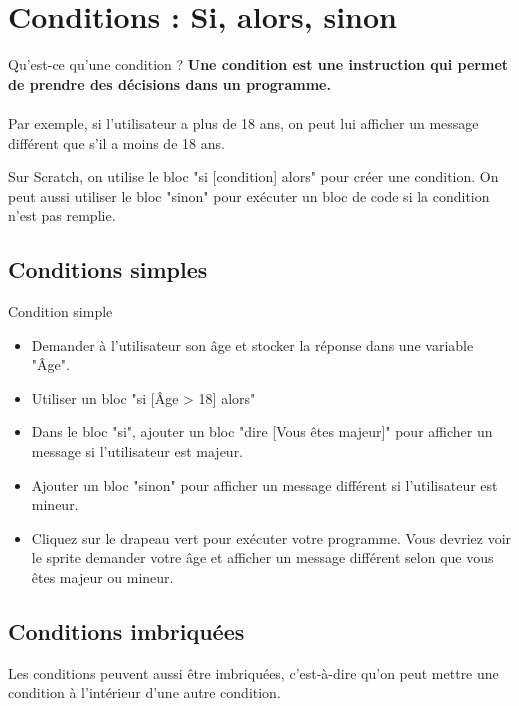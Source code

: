 


\section{Conditions : Si, alors, sinon}
\begin{UPSTIinfor}{Qu'est-ce qu'une condition ?}
    \vspace{1em}
\textbf{Une condition est une instruction qui permet de prendre des décisions dans un programme.}\\\\
Par exemple, si l'utilisateur a plus de 18 ans, on peut lui afficher un message différent que s'il a moins de 18 ans.
\end{UPSTIinfor}

Sur Scratch, on utilise le bloc "si [condition] alors" pour créer une condition. 
On peut aussi utiliser le bloc "sinon" pour exécuter un bloc de code si la condition n'est pas remplie.

\subsection{Conditions simples}
\begin{UPSTIManipulation}{Condition simple}
\begin{itemize}[label=$\square$]
        \item Demander à l'utilisateur son âge et stocker la réponse dans une variable "Âge".
        \item Utiliser un bloc "si [Âge > 18] alors"
        \item Dans le bloc "si", ajouter un bloc "dire [Vous êtes majeur]" pour afficher un message si l'utilisateur est majeur.
        \item Ajouter un bloc "sinon" pour afficher un message différent si l'utilisateur est mineur.
        \item Cliquez sur le drapeau vert pour exécuter votre programme. Vous devriez voir le sprite demander votre âge et afficher un message différent selon que vous êtes majeur ou mineur.
        \end{itemize}
\end{UPSTIManipulation}

\subsection{Conditions imbriquées}
Les conditions peuvent aussi être imbriquées, c'est-à-dire qu'on peut mettre une condition à l'intérieur d'une autre condition. 


